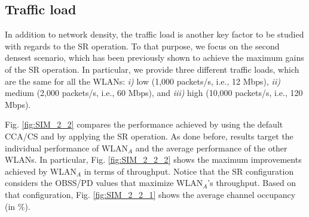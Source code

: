 \documentclass[comsoc]{IEEEtran}
\begin{document}
	\subsection{Traffic load}
	\label{section:random_scenarios_traffic_load}
	In addition to network density, the traffic load is another key factor to be studied with regards to the SR operation. To that purpose, we focus on the second densest scenario, which has been previously shown to achieve the maximum gains of the SR operation. In particular, we provide three different traffic loads, which are the same for all the WLANs: \emph{i)} low (1,000 packets/s, i.e., 12 Mbps), \emph{ii)} medium (2,000 packets/s, i.e., 60 Mbps), and \emph{iii)} high (10,000 packets/s, i.e., 120 Mbps). 
	
	Fig. \ref{fig:SIM_2_2} compares the performance achieved by using the default CCA/CS and by applying the SR operation. As done before, results target the individual performance of $\text{WLAN}_A$ and the average performance of the other WLANs. In particular, Fig. \ref{fig:SIM_2_2_2} shows the maximum improvements achieved by WLAN$_A$ in terms of throughput. Notice that the SR configuration considers the OBSS/PD values that maximize WLAN$_A$'s throughput. Based on that configuration, Fig. \ref{fig:SIM_2_2_1} shows the average channel occupancy (in \%).
	
\end{document}
